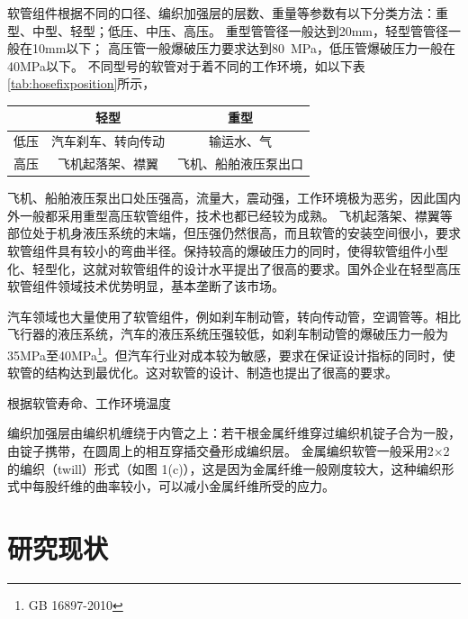 软管组件根据不同的口径、编织加强层的层数、重量等参数有以下分类方法：重型、中型、轻型；低压、中压、高压。
重型管管径一般达到20mm，轻型管管径一般在10mm以下；
高压管一般爆破压力要求达到\SI{80}{\mega\pascal}，低压管爆破压力一般在40MPa以下。
不同型号的软管对于着不同的工作环境，如以下表\ref{tab:hosefixposition}所示，




\begin{table}[!htbp]
	\centering
		
	\begin{tabular}{ccc}
		\toprule
		&    轻型     &     重型     \\ \hline
		低压 & 汽车刹车、转向传动 &  输运水、气  \\
		高压 & 飞机起落架、襟翼  & 飞机、船舶液压泵出口 \\ 
		\bottomrule
	\end{tabular} 
\end{table}

飞机、船舶液压泵出口处压强高，流量大，震动强，工作环境极为恶劣，因此国内外一般都采用重型高压软管组件，技术也都已经较为成熟。
飞机起落架、襟翼等部位处于机身液压系统的末端，但压强仍然很高，而且软管的安装空间很小，要求软管组件具有较小的弯曲半径。保持较高的爆破压力的同时，使得软管组件小型化、轻型化，这就对软管组件的设计水平提出了很高的要求。国外企业在轻型高压软管组件领域技术优势明显，基本垄断了该市场。

汽车领域也大量使用了软管组件，例如刹车制动管，转向传动管，空调管等。相比飞行器的液压系统，汽车的液压系统压强较低，如刹车制动管的爆破压力一般为35MPa至40MPa\footnote{GB 16897-2010}。但汽车行业对成本较为敏感，要求在保证设计指标的同时，使软管的结构达到最优化。这对软管的设计、制造也提出了很高的要求。

根据软管寿命、工作环境温度











编织加强层由编织机缠绕于内管之上：若干根金属纤维穿过编织机锭子合为一股，由锭子携带，在圆周上的相互穿插交叠形成编织层。
金属编织软管一般采用2×2的编织（twill）形式（如图 1(c)），这是因为金属纤维一般刚度较大，这种编织形式中每股纤维的曲率较小，可以减小金属纤维所受的应力。

 	 	 
					
\section{研究现状}

